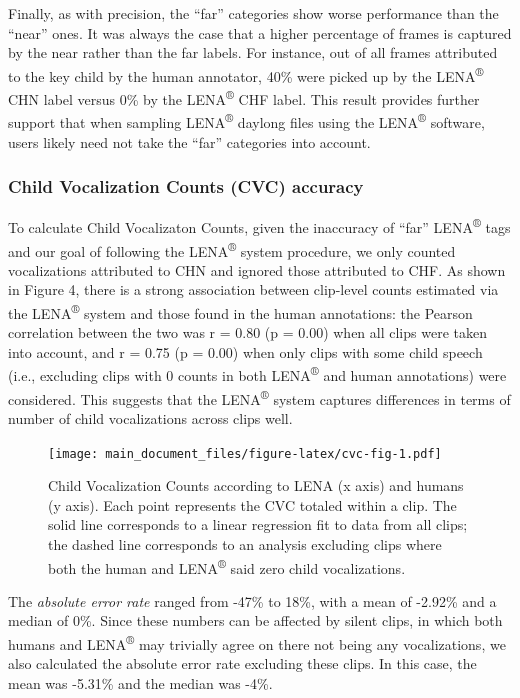 \documentclass[english,floatsintext,man]{apa6}
\begin{document}
Finally, as with precision, the \enquote{far} categories show worse
performance than the \enquote{near} ones. It was always the case that a
higher percentage of frames is captured by the near rather than the far
labels. For instance, out of all frames attributed to the key child by
the human annotator, 40\% were picked up by the LENA\textsuperscript{®}
CHN label versus 0\% by the LENA\textsuperscript{®} CHF label. This
result provides further support that when sampling
LENA\textsuperscript{®} daylong files using the LENA\textsuperscript{®}
software, users likely need not take the \enquote{far} categories into
account.

\subsubsection{Child Vocalization Counts (CVC)
accuracy}\label{child-vocalization-counts-cvc-accuracy}

To calculate Child Vocalizaton Counts, given the inaccuracy of
\enquote{far} LENA\textsuperscript{®} tags and our goal of following the
LENA\textsuperscript{®} system procedure, we only counted vocalizations
attributed to CHN and ignored those attributed to CHF. As shown in
Figure 4, there is a strong association between clip-level counts
estimated via the LENA\textsuperscript{®} system and those found in the
human annotations: the Pearson correlation between the two was r = 0.80
(p = 0.00) when all clips were taken into account, and r = 0.75 (p =
0.00) when only clips with some child speech (i.e., excluding clips with
0 counts in both LENA\textsuperscript{®} and human annotations) were
considered. This suggests that the LENA\textsuperscript{®} system
captures differences in terms of number of child vocalizations across
clips well.

\begin{figure}
\centering
\texttt{[image: main\_document\_files/figure-latex/cvc-fig-1.pdf]}
\caption{\label{fig:cvc-fig}Child Vocalization Counts according to LENA (x
axis) and humans (y axis). Each point represents the CVC totaled within
a clip. The solid line corresponds to a linear regression fit to data
from all clips; the dashed line corresponds to an analysis excluding
clips where both the human and LENA\textsuperscript{®} said zero child
vocalizations.}
\end{figure}

The \emph{absolute error rate} ranged from -47\% to 18\%, with a mean of
-2.92\% and a median of 0\%. Since these numbers can be affected by
silent clips, in which both humans and LENA\textsuperscript{®} may
trivially agree on there not being any vocalizations, we also calculated
the absolute error rate excluding these clips. In this case, the mean
was -5.31\% and the median was -4\%.
\end{document}
